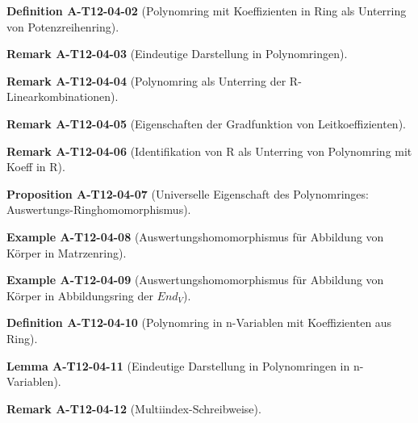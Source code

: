 \documentclass[10pt, letterpaper]{article}
\newcommand{\CustomHeading}[3]{%
  \par\medskip\noindent%
  \textbf{#1 #2} \textnormal{(#3)}.\enskip%
}
\newenvironment{DEF}[2]{\CustomHeading{Definition}{#1}{#2}}{}
\newenvironment{PROP}[2]{\CustomHeading{Proposition}{#1}{#2}}{}
\newenvironment{LEM}[2]{\CustomHeading{Lemma}{#1}{#2}}{}
\newenvironment{REM}[2]{\CustomHeading{Remark}{#1}{#2}}{}
\newenvironment{EXA}[2]{\CustomHeading{Example}{#1}{#2}}{}
\begin{document}
\begin{DEF}{A-T12-04-02}{Polynomring mit Koeffizienten in Ring als Unterring von Potenzreihenring}
\end{DEF}

\begin{REM}{A-T12-04-03}{Eindeutige Darstellung in Polynomringen}
\end{REM}

\begin{REM}{A-T12-04-04}{Polynomring als Unterring der R-Linearkombinationen}
\end{REM}

\begin{REM}{A-T12-04-05}{Eigenschaften der Gradfunktion von Leitkoeffizienten}
\end{REM}

\begin{REM}{A-T12-04-06}{Identifikation von R als Unterring von Polynomring mit Koeff in R}
\end{REM}

\begin{PROP}{A-T12-04-07}{Universelle Eigenschaft des Polynomringes: Auswertungs-Ringhomomorphismus}
\end{PROP}

\begin{EXA}{A-T12-04-08}{Auswertungshomomorphismus für Abbildung von Körper in Matrzenring}
\end{EXA}

\begin{EXA}{A-T12-04-09}{Auswertungshomomorphismus für Abbildung von Körper in Abbildungsring der $End_V$}
\end{EXA}

\begin{DEF}{A-T12-04-10}{Polynomring in n-Variablen mit Koeffizienten aus Ring}
\end{DEF}

\begin{LEM}{A-T12-04-11}{Eindeutige Darstellung in Polynomringen in n-Variablen}
\end{LEM}

\begin{REM}{A-T12-04-12}{Multiindex-Schreibweise}
\end{REM}
\end{document}
